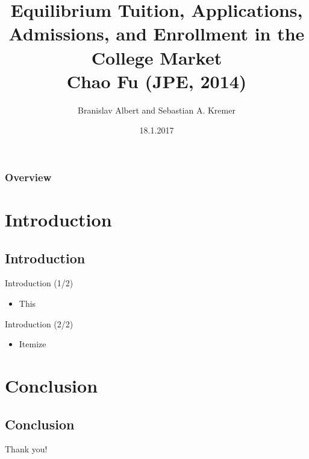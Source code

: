\documentclass{beamer}
\title[Fu (2014)]{Equilibrium Tuition, Applications, Admissions, and Enrollment in the College Market\\
	Chao Fu (JPE, 2014)}
\author{Branislav Albert and Sebastian A. Kremer}
\date{18.1.2017}
\begin{document}
\begin{frame}
  \titlepage
\end{frame}

\begin{frame}
\frametitle{Overview}
\tableofcontents
\end{frame}


\section{Introduction}
\subsection*{Introduction}

\begin{frame}{Introduction (1/2)} %
\begin{itemize}
  \item This
\end{itemize}
\end{frame}

\begin{frame}{Introduction (2/2)} %
\begin{itemize}
  \item Itemize
\end{itemize}
\end{frame}


\section{Conclusion}
\subsection*{Conclusion}

\begin{frame}
\Huge{\centerline{Thank you!}}
\end{frame}


\end{document}

